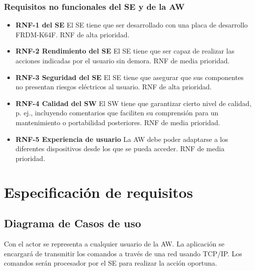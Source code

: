\subsubsection{Requisitos no funcionales del SE y de la AW}
\label{sec:spec-nofuncionales}
\begin{itemize}
  \item \textbf{RNF-1   del SE} El SE tiene que ser
  desarrollado con una placa de desarrollo FRDM-K64F. RNF de alta prioridad.
  \item \textbf{RNF-2 Rendimiento del SE} El SE tiene que ser capaz de realizar
  las acciones indicadas por el usuario sin demora. RNF de media prioridad.
  \item \textbf{RNF-3 Seguridad del SE} El SE tiene que asegurar que sus
  componentes no presentan riesgos eléctricos al usuario. RNF de alta prioridad.
  \item \textbf{RNF-4 Calidad del SW} El SW tiene que garantizar cierto nivel
  de calidad, p. ej., incluyendo comentarios que faciliten su comprensión para
  un mantenimiento o portabilidad posteriores. RNF de media prioridad.
  \item \textbf{RNF-5 Experiencia de usuario} La AW debe poder adaptarse a
  los diferentes dispositivos desde los que se pueda acceder. RNF de media
  prioridad.
\end{itemize}

\bigskip

\section{Especificación de requisitos} \label{sec:especificacion}
\subsection{Diagrama de Casos de uso} \label{sec:diag-casos-uso}
Con el actor se representa a cualquier usuario de la AW. La aplicación se
encargará de transmitir los comandos a través de una red usando TCP/IP.
Los comandos serán procesador por el SE para realizar la acción oportuna.

 

